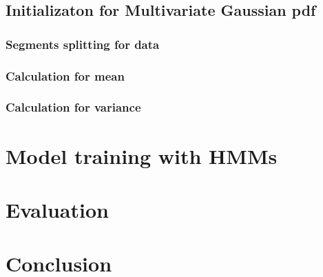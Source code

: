 \documentclass{article}
\begin{document}
\subsection{Initializaton for Multivariate Gaussian pdf}

\subsubsection{Segments splitting for data}

\subsubsection{Calculation for mean}

\subsubsection{Calculation for variance}


\section{Model training with HMMs}


\section{Evaluation}


\section{Conclusion}




\newcommand{\doi}[1]{DOI: \href{http://dx.doi.org/#1}{\nolinkurl{#1}}}



\end{document}
